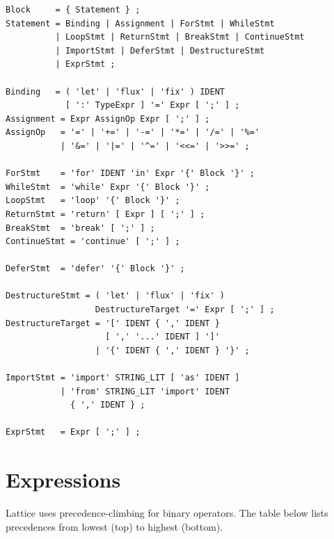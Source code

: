 \begin{lstlisting}[style=ebnf]
Block     = { Statement } ;
Statement = Binding | Assignment | ForStmt | WhileStmt
          | LoopStmt | ReturnStmt | BreakStmt | ContinueStmt
          | ImportStmt | DeferStmt | DestructureStmt
          | ExprStmt ;

Binding   = ( 'let' | 'flux' | 'fix' ) IDENT
            [ ':' TypeExpr ] '=' Expr [ ';' ] ;
Assignment = Expr AssignOp Expr [ ';' ] ;
AssignOp   = '=' | '+=' | '-=' | '*=' | '/=' | '%='
           | '&=' | '|=' | '^=' | '<<=' | '>>=' ;

ForStmt    = 'for' IDENT 'in' Expr '{' Block '}' ;
WhileStmt  = 'while' Expr '{' Block '}' ;
LoopStmt   = 'loop' '{' Block '}' ;
ReturnStmt = 'return' [ Expr ] [ ';' ] ;
BreakStmt  = 'break' [ ';' ] ;
ContinueStmt = 'continue' [ ';' ] ;

DeferStmt  = 'defer' '{' Block '}' ;

DestructureStmt = ( 'let' | 'flux' | 'fix' )
                  DestructureTarget '=' Expr [ ';' ] ;
DestructureTarget = '[' IDENT { ',' IDENT }
                    [ ',' '...' IDENT ] ']'
                  | '{' IDENT { ',' IDENT } '}' ;

ImportStmt = 'import' STRING_LIT [ 'as' IDENT ]
           | 'from' STRING_LIT 'import' IDENT
             { ',' IDENT } ;

ExprStmt   = Expr [ ';' ] ;
\end{lstlisting}


\section{Expressions}

Lattice uses precedence-climbing for binary operators.
The table below lists precedences from lowest (top) to highest (bottom).

